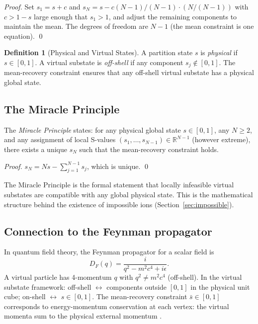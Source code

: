 \documentclass[twocolumn,10pt,a4paper]{article}
\theoremstyle{thmstyle}
\theoremstyle{definition}
\newtheorem{definition}[theorem]{Definition}
\theoremstyle{remark}
\newcommand{\R}{\mathbb{R}}
\begin{document}
\begin{proof}
Set $s_1 = s + c$ and $s_N = s - c(N-1)/(N-1) \cdot (N/(N-1))$
with $c > 1 - s$ large enough that $s_1 > 1$, and adjust the remaining
components to maintain the mean. The degrees of freedom are $N - 1$
(the mean constraint is one equation). \qed
\end{proof}

\begin{definition}[Physical and Virtual States]
A partition state $s$ is \emph{physical} if $s \in [0,1]$.
A virtual substate is \emph{off-shell} if any component $s_j \notin [0,1]$.
The mean-recovery constraint ensures that any off-shell virtual substate
has a physical global state.
\end{definition}

\subsection{The Miracle Principle}

The \emph{Miracle Principle} states: for any physical global state
$s \in [0,1]$, any $N \geq 2$, and any assignment of local S-values
$(s_1, \ldots, s_{N-1}) \in \R^{N-1}$ (however extreme), there exists
a unique $s_N$ such that the mean-recovery constraint holds.

\begin{proof}
$s_N = Ns - \sum_{j=1}^{N-1} s_j$, which is unique. \qed
\end{proof}

The Miracle Principle is the formal statement that locally infeasible
virtual substates are compatible with any global physical state. This
is the mathematical structure behind the existence of impossible ions
(Section~\ref{sec:impossible}).

\subsection{Connection to the Feynman propagator}

In quantum field theory, the Feynman propagator for a scalar field is
\begin{equation}
D_F(q) = \frac{i}{q^2 - m^2c^4 + i\epsilon}.
\label{eq:propagator}
\end{equation}
A virtual particle has 4-momentum $q$ with $q^2 \neq m^2c^4$ (off-shell).
In the virtual substate framework: off-shell $\leftrightarrow$ components
outside $[0,1]$ in the physical unit cube; on-shell $\leftrightarrow$
$s \in [0,1]$. The mean-recovery constraint $\bar{s} \in [0,1]$
corresponds to energy-momentum conservation at each vertex: the virtual
momenta sum to the physical external momentum \citep{peskin1995}.
\end{document}

